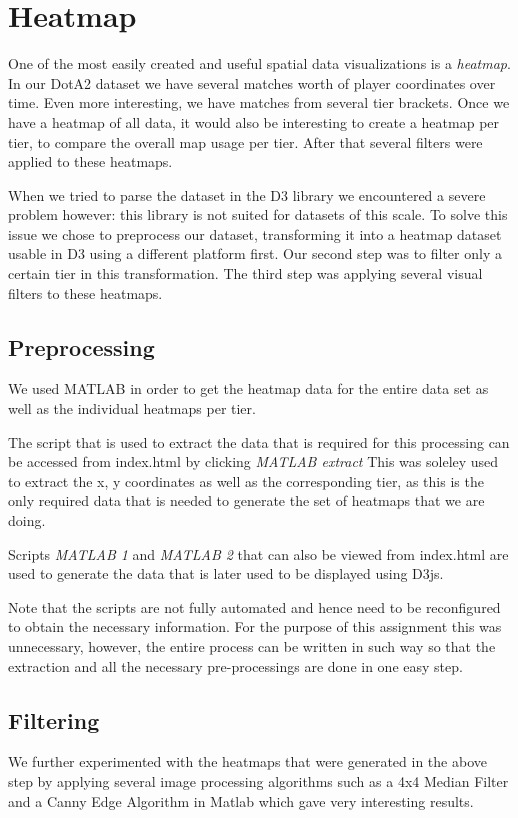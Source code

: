 \section{Heatmap}
One of the most easily created and useful spatial data visualizations is a \emph{heatmap}. In our DotA2 dataset we have several matches worth of player coordinates over time. Even more interesting, we have matches from several tier brackets. Once we have a heatmap of all data, it would also be interesting to create a heatmap per tier, to compare the overall map usage per tier. After that several filters were applied to these heatmaps.

When we tried to parse the dataset in the D3 library we encountered a severe problem however: this library is not suited for datasets of this scale. To solve this issue we chose to preprocess our dataset, transforming it into a heatmap dataset usable in D3 using a different platform first. Our second step was to filter only a certain tier in this transformation. The third step was applying several visual filters to these heatmaps.

\subsection{Preprocessing}
We used MATLAB in order to get the heatmap data for the entire data set as well as the individual heatmaps per tier.

The script that is used to extract the data that is required for this processing can be accessed from index.html by clicking \textit{MATLAB extract} This was soleley used to extract the x, y coordinates as well as the corresponding tier, as this is the only required data that is needed to generate the set of heatmaps that we are doing.

Scripts \textit{MATLAB 1} and \textit{MATLAB 2} that can also be viewed from index.html are used to generate the data that is later used to be displayed using D3js.

Note that the scripts are not fully automated and hence need to be reconfigured to obtain the necessary information. For the purpose of this assignment this was unnecessary, however, the entire process can be written in such way so that the extraction and all the necessary pre-processings are done in one easy step.

\subsection{Filtering}
We further experimented with the heatmaps that were generated in the above step by applying several image processing algorithms such as a 4x4 Median Filter and a Canny Edge Algorithm in Matlab which gave very interesting results.

